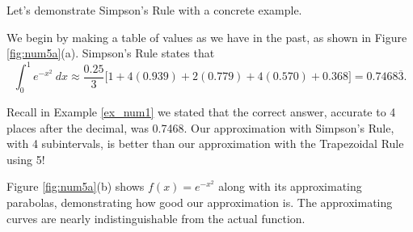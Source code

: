 Let's demonstrate Simpson's Rule with a concrete example.\\

{We begin by making a table of values as we have in the past, as shown in Figure \ref{fig:num5a}(a).
Simpson's Rule states that $$\int_0^1e^{-x^2}\ dx \approx \frac{0.25}{3}\Big[1+4(0.939)+2(0.779)+4(0.570) + 0.368\Big] = 0.7468\overline{3}.$$

Recall in Example \ref{ex_num1} we stated that the correct answer, accurate to 4 places after the decimal, was 0.7468. Our approximation with Simpson's Rule, with 4 subintervals, is better than our approximation with the Trapezoidal Rule using 5!


Figure \ref{fig:num5a}(b) shows $f(x) = e^{-x^2}$ along with its approximating parabolas, demonstrating how good our approximation is. The approximating curves are nearly indistinguishable from the actual function.}

